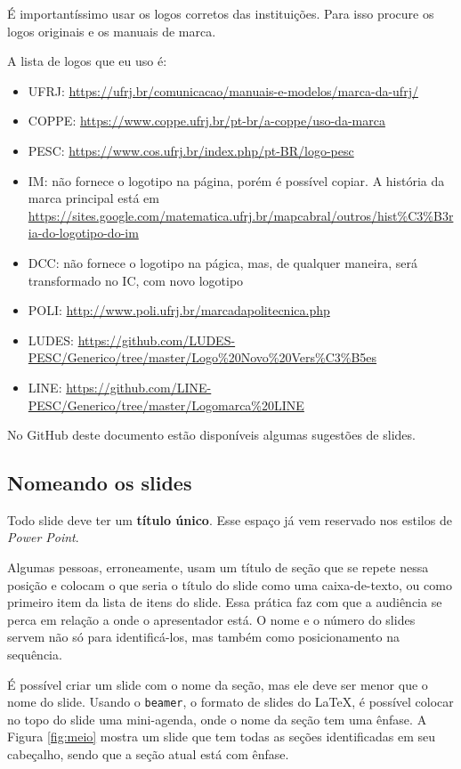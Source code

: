 É importantíssimo usar os logos corretos das instituições. Para isso procure os logos originais e os manuais de marca.

A lista de logos que eu uso é:
\begin{itemize}
    \item UFRJ: \url{https://ufrj.br/comunicacao/manuais-e-modelos/marca-da-ufrj/}
    \item COPPE: \url{https://www.coppe.ufrj.br/pt-br/a-coppe/uso-da-marca}
    \item PESC:  \url{https://www.cos.ufrj.br/index.php/pt-BR/logo-pesc}
    \item IM: não fornece o logotipo na página, porém é possível copiar. A história da marca principal está em \url{https://sites.google.com/matematica.ufrj.br/mapcabral/outros/hist%C3%B3ria-do-logotipo-do-im}
    \item DCC: não fornece o logotipo na págica, mas, de qualquer maneira, será transformado no IC, com novo logotipo
    \item POLI: \url{http://www.poli.ufrj.br/marcadapolitecnica.php}
    \item LUDES: \url{https://github.com/LUDES-PESC/Generico/tree/master/Logo%20Novo%20Vers%C3%B5es}
    \item LINE: \url{https://github.com/LINE-PESC/Generico/tree/master/Logomarca%20LINE}
\end{itemize}

No GitHub deste documento estão disponíveis algumas sugestões de slides.


\subsection{Nomeando os slides}

Todo slide deve ter um \textbf{título único}. Esse espaço já vem reservado nos estilos de \textit{Power Point}.

Algumas pessoas, erroneamente, usam um título de seção que se repete nessa posição e colocam o que seria o título do slide como uma caixa-de-texto, ou como primeiro item da lista de itens do slide. Essa prática faz com que a audiência se perca em relação a onde o apresentador está. O nome e o número do slides servem não só para identificá-los, mas também como posicionamento na sequência.

É possível criar um slide com o nome da seção, mas ele deve ser menor que o nome do slide. Usando o \texttt{beamer}, o formato de slides do \LaTeX, é possível colocar no topo do slide uma mini-agenda, onde o nome da seção tem uma ênfase. A Figura \ref{fig:meio} mostra um slide que tem todas as seções identificadas em seu cabeçalho, sendo que a seção atual está com ênfase.





